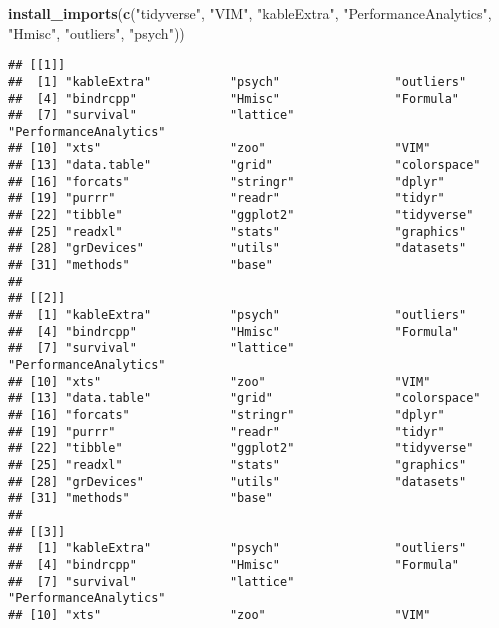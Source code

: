 \documentclass[]{article}
\newenvironment{Shaded}{\begin{snugshade}}{\end{snugshade}}
\newcommand{\KeywordTok}[1]{\textcolor[rgb]{0.13,0.29,0.53}{\textbf{#1}}}
\newcommand{\NormalTok}[1]{#1}
\newcommand{\StringTok}[1]{\textcolor[rgb]{0.31,0.60,0.02}{#1}}
\begin{document}
\begin{Shaded}
\begin{Highlighting}[]
\KeywordTok{install_imports}\NormalTok{(}\KeywordTok{c}\NormalTok{(}\StringTok{"tidyverse"}\NormalTok{, }\StringTok{"VIM"}\NormalTok{, }\StringTok{"kableExtra"}\NormalTok{, }\StringTok{"PerformanceAnalytics"}\NormalTok{, }\StringTok{"Hmisc"}\NormalTok{, }\StringTok{"outliers"}\NormalTok{, }\StringTok{"psych"}\NormalTok{)) }
\end{Highlighting}
\end{Shaded}

\begin{verbatim}
## [[1]]
##  [1] "kableExtra"           "psych"                "outliers"            
##  [4] "bindrcpp"             "Hmisc"                "Formula"             
##  [7] "survival"             "lattice"              "PerformanceAnalytics"
## [10] "xts"                  "zoo"                  "VIM"                 
## [13] "data.table"           "grid"                 "colorspace"          
## [16] "forcats"              "stringr"              "dplyr"               
## [19] "purrr"                "readr"                "tidyr"               
## [22] "tibble"               "ggplot2"              "tidyverse"           
## [25] "readxl"               "stats"                "graphics"            
## [28] "grDevices"            "utils"                "datasets"            
## [31] "methods"              "base"                
## 
## [[2]]
##  [1] "kableExtra"           "psych"                "outliers"            
##  [4] "bindrcpp"             "Hmisc"                "Formula"             
##  [7] "survival"             "lattice"              "PerformanceAnalytics"
## [10] "xts"                  "zoo"                  "VIM"                 
## [13] "data.table"           "grid"                 "colorspace"          
## [16] "forcats"              "stringr"              "dplyr"               
## [19] "purrr"                "readr"                "tidyr"               
## [22] "tibble"               "ggplot2"              "tidyverse"           
## [25] "readxl"               "stats"                "graphics"            
## [28] "grDevices"            "utils"                "datasets"            
## [31] "methods"              "base"                
## 
## [[3]]
##  [1] "kableExtra"           "psych"                "outliers"            
##  [4] "bindrcpp"             "Hmisc"                "Formula"             
##  [7] "survival"             "lattice"              "PerformanceAnalytics"
## [10] "xts"                  "zoo"                  "VIM"                 

\end{verbatim}
\end{document}
